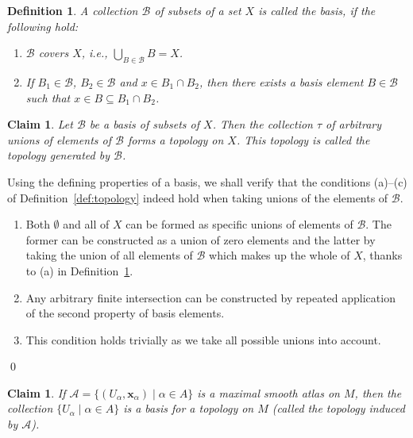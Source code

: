 \documentclass[11pt,a4paper,twoside,openany]{report}
\theoremstyle{my-theorem}
\newtheorem{claim}[theorem]{Claim}
\theoremstyle{non-theorem}
\newtheorem{definition}[theorem]{Definition}
\renewenvironment{proof}[1][\proofname]{{\scshape #1. }}{\qed}
\begin{document}
		\begin{definition}
			\label{def:basis}
			A collection $\mathcal B$ of subsets of a set $X$ is called the \emph{basis}, if the following hold:
			\begin{enumerate}[label=\rm(\alph*)]
				\item $\mathcal B$ covers $X$, i.e., $\bigcup_{B \in \mathcal B} B = X$.
				\item If $B_1 \in \mathcal B$, $B_2 \in \mathcal B$ and $x \in B_1 \cap B_2$, then there exists a basis element $B \in \mathcal B$ such that $x \in B \subseteq B_1 \cap B_2$.
			\end{enumerate}
		\end{definition}
	
		\begin{claim}
			\label{claim:topology-generated-by-basis}
			Let $\mathcal B$ be a basis of subsets of $X$. Then the collection $\tau$ of arbitrary unions of elements of $\mathcal B$ forms a topology on $X$. This topology is called the topology \emph{generated} by $\mathcal B$.
		\end{claim}
	
		\begin{proof}
			Using the defining properties of a basis, we shall verify that the conditions (a)--(c) of Definition~\ref{def:topology} indeed hold when taking unions of the elements of $\mathcal B$.
			\begin{enumerate}[label=\rm(\alph*)]
				\item Both $\emptyset$ and all of $X$ can be formed as specific unions of elements of $\mathcal B$. The former can be constructed as a union of zero elements and the latter by taking the union of all elements of $\mathcal B$ which makes up the whole of $X$, thanks to (a) in Definition~\ref{def:basis}.
				\item Any arbitrary finite intersection can be constructed by repeated application of the second property of basis elements.
				\item This condition holds trivially as we take all possible unions into account.
			\end{enumerate}
		\end{proof}
	
		\begin{claim}
			\label{claim:topology-generated-by-atlas}
			If $\mathcal A = \{(U_\alpha, \mathbf x_\alpha) \mid \alpha \in A\}$ is a maximal smooth atlas on $M$, then the collection $\{U_\alpha \mid \alpha \in A\}$ is a basis for a topology on $M$ (called the \emph{topology induced by} $\mathcal A$).
		\end{claim}
	
\end{document}
